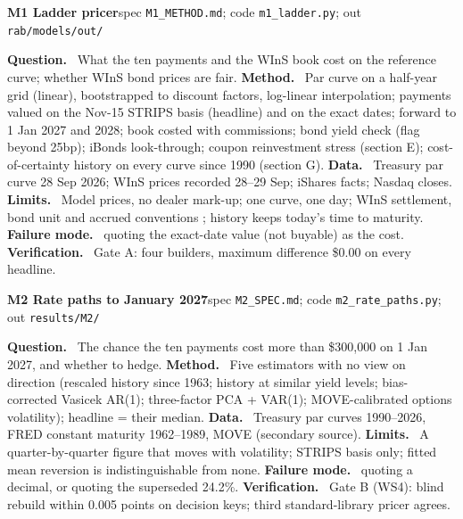 \small
\newcommand{\card}[2]{\par\medskip\noindent\colorbox{black!6}{\parbox{\dimexpr\textwidth-2\fboxsep}{\textbf{#1}\hfill{\footnotesize #2}}}\par\smallskip}
\newcommand{\cf}[1]{\textbf{#1.}~}

\card{M1 Ladder pricer}{spec \texttt{M1\_METHOD.md}; code \texttt{m1\_ladder.py}; out \texttt{rab/models/out/}}
\cf{Question} What the ten payments and the WInS book cost on the reference curve; whether WInS bond prices are fair.
\cf{Method} Par curve on a half-year grid (linear), bootstrapped to discount factors, log-linear interpolation;
payments valued on the Nov-15 STRIPS basis (headline) and on the exact dates; forward to 1 Jan 2027 and 2028; book
costed with commissions; bond yield check (flag beyond 25bp); iBonds look-through; coupon reinvestment stress (section E);
cost-of-certainty history on every curve since 1990 (section G).
\cf{Data} Treasury par curve 28 Sep 2026; WInS prices recorded 28--29 Sep; iShares facts; Nasdaq closes.
\cf{Limits} Model prices, no dealer mark-up; one curve, one day; WInS settlement, bond unit and accrued conventions \UNV;
history keeps today's time to maturity. \cf{Failure mode} quoting the exact-date value (not buyable) as the cost.
\cf{Verification} Gate A: four builders, maximum difference \$0.00 on every headline.

\card{M2 Rate paths to January 2027}{spec \texttt{M2\_SPEC.md}; code \texttt{m2\_rate\_paths.py}; out \texttt{results/M2/}}
\cf{Question} The chance the ten payments cost more than \$300,000 on 1 Jan 2027, and whether to hedge.
\cf{Method} Five estimators with no view on direction (rescaled history since 1963; history at similar yield levels;
bias-corrected Vasicek AR(1); three-factor PCA + VAR(1); MOVE-calibrated options volatility); headline = their median.
\cf{Data} Treasury par curves 1990--2026, FRED constant maturity 1962--1989, MOVE (secondary source).
\cf{Limits} A quarter-by-quarter figure that moves with volatility; STRIPS basis only; fitted mean reversion is
indistinguishable from none. \cf{Failure mode} quoting a decimal, or quoting the superseded 24.2\%.
\cf{Verification} Gate B (WS4): blind rebuild within 0.005 points on decision keys; third standard-library pricer agrees.

